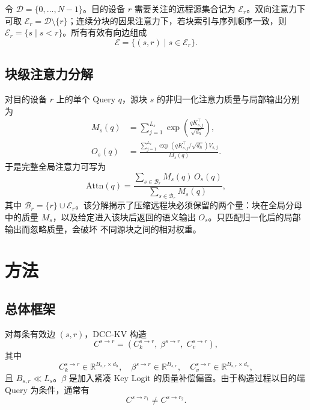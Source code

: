 \documentclass[sigconf,nonacm]{acmart}
\newcommand{\Attn}{\mathrm{Attn}}
\newcommand{\Er}{\mathcal{E}_r}
\newcommand{\Br}{\mathcal{B}_r}
\newcommand{\Ds}{\mathcal{D}}
\begin{document}
令 $\Ds = \{0,\ldots,N-1\}$。目的设备 $r$ 需要关注的远程源集合记为 $\Er$。双向注意力下可取
$\Er = \Ds \setminus \{r\}$；连续分块的因果注意力下，若块索引与序列顺序一致，则
$\Er = \{s \mid s < r\}$。所有有效有向边组成
\begin{equation}
\mathcal{E} = \{(s,r) \mid s \in \Er\}.
\label{eq:edge-set}
\end{equation}

\subsection{块级注意力分解}

对目的设备 $r$ 上的单个 Query $q$，源块 $s$ 的非归一化注意力质量与局部输出分别为
\begin{align}
M_s(q) &= \sum_{j=1}^{L_s} \exp\!\left(\frac{q K_{s,j}^\top}{\sqrt{d_h}}\right),
\label{eq:mass} \\
O_s(q) &= \frac{\sum_{j=1}^{L_s} \exp\!\left(q K_{s,j}^\top / \sqrt{d_h}\right) V_{s,j}}{M_s(q)} .
\label{eq:out}
\end{align}
于是完整全局注意力可写为
\begin{equation}
\Attn(q) = \frac{\sum_{s \in \Br} M_s(q) \, O_s(q)}{\sum_{s \in \Br} M_s(q)} ,
\label{eq:global-attn}
\end{equation}
其中 $\Br = \{r\} \cup \Er$。该分解揭示了压缩远程块必须保留的两个量：块在全局分母中的质量
$M_s$，以及给定进入该块后返回的语义输出 $O_s$。只匹配归一化后的局部输出而忽略质量，会破坏
不同源块之间的相对权重。

\section{方法}
\label{sec:method}

\subsection{总体框架}

对每条有效边 $(s,r)$，DCC-KV 构造
\begin{equation}
C^{s \to r} = \left(C_k^{s \to r},\; \beta^{s \to r},\; C_v^{s \to r}\right),
\label{eq:compact}
\end{equation}
其中
\begin{equation}
C_k^{s \to r} \in \mathbb{R}^{B_{s,r} \times d_h},\quad
\beta^{s \to r} \in \mathbb{R}^{B_{s,r}},\quad
C_v^{s \to r} \in \mathbb{R}^{B_{s,r} \times d_v},
\label{eq:compact-shapes}
\end{equation}
且 $B_{s,r} \ll L_s$。$\beta$ 是加入紧凑 Key Logit 的质量补偿偏置。由于构造过程以目的端
Query 为条件，通常有
\begin{equation}
C^{s \to r_1} \neq C^{s \to r_2}.
\label{eq:per-edge-diff}
\end{equation}
\end{document}
